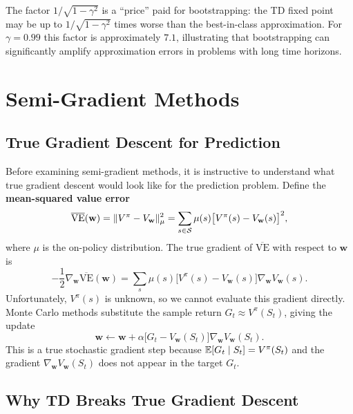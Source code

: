 The factor $1/\sqrt{1-\gamma^2}$ is a ``price'' paid for bootstrapping: the TD fixed point may be
up to $1/\sqrt{1-\gamma^2}$ times worse than the best-in-class approximation.  For $\gamma = 0.99$
this factor is approximately $7.1$, illustrating that bootstrapping can significantly amplify
approximation errors in problems with long time horizons.

\section{Semi-Gradient Methods}
\label{sec:semi-gradient}

\subsection{True Gradient Descent for Prediction}

Before examining semi-gradient methods, it is instructive to understand what true gradient descent
would look like for the prediction problem.  Define the \textbf{mean-squared value
error}
\begin{equation}
\label{eq:msve}
\overline{\mathrm{VE}}(\mathbf{w})
= \|V^\pi - V_{\mathbf{w}}\|_{\mu}^{2}
= \sum_{s \in \mathcal{S}} \mu(s)\bigl[V^\pi(s) - V_\mathbf{w}(s)\bigr]^2,
\end{equation}
where $\mu$ is the on-policy distribution.  The true gradient of $\overline{\mathrm{VE}}$
with respect to $\mathbf{w}$ is
\begin{equation}
\label{eq:true-grad-msve}
-\frac{1}{2}\nabla_\mathbf{w}\overline{\mathrm{VE}}(\mathbf{w})
= \sum_s \mu(s)\bigl[V^\pi(s) - V_\mathbf{w}(s)\bigr]\nabla_\mathbf{w} V_\mathbf{w}(s).
\end{equation}
Unfortunately, $V^\pi(s)$ is unknown, so we cannot evaluate this gradient directly.  Monte Carlo
methods substitute the sample return $G_t \approx V^\pi(S_t)$, giving the update
\[
\mathbf{w} \leftarrow \mathbf{w} + \alpha\bigl[G_t - V_\mathbf{w}(S_t)\bigr]\nabla_\mathbf{w} V_\mathbf{w}(S_t).
\]
This is a true stochastic gradient step because $\operatorname{\mathbb{E}}[G_t \mid S_t] = V^\pi(S_t)$ and the
gradient $\nabla_\mathbf{w} V_\mathbf{w}(S_t)$ does not appear in the target $G_t$.

\subsection{Why TD Breaks True Gradient Descent}

